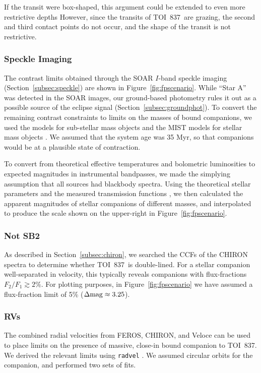 \documentclass[12pt,twocolumn,tighten]{aastex63}
\newcommand{\tn}{TOI~837} %
\begin{document}
If the transit were box-shaped, this argument could be extended to
even more restrictive depths \citep[{\it
e.g.},][]{seager_unique_2003,vanderburg_hr858_2019,rizzuto_tess_2020}
However, since the transits of \tn\ are grazing, the second and third
contact points do not occur, and the shape of the transit is not
restrictive.

\subsubsection{Speckle Imaging}
The contrast limits obtained through the SOAR $I$-band speckle imaging
(Section~\ref{subsec:speckle}) are shown in
Figure~\ref{fig:fpscenario}.  While ``Star A'' was detected in the
SOAR images, our ground-based photometry rules it out as a possible
source of the eclipse signal (Section~\ref{subsec:groundphot}).  To
convert the remaining contrast constraints to limits on the masses of
bound companions, we used the \citet{baraffe_evolutionary_2003} models
for sub-stellar mass objects and the MIST models for stellar mass
objects
\citep{paxton_modules_2011,paxton_modules_2013,paxton_modules_2015,dotter_mesa_2016,choi_mesa_2016}.
We assumed that the system age was 35 Myr, so that companions would be
at a plausible state of contraction.

To convert from theoretical effective temperatures and bolometric
luminosities to expected magnitudes in instrumental bandpasses, we
made the simplying assumption that all sources had blackbody spectra.
Using the theoretical stellar parameters and the measured transmission
functions \citep{tokovinin_ten_2018}, we then calculated the apparent
magnitudes of stellar companions of different masses, and interpolated
to produce the scale shown on the upper-right in
Figure~\ref{fig:fpscenario}.

\subsubsection{Not SB2}
As described in Section~\ref{subsec:chiron}, we searched the CCFs of
the CHIRON spectra to determine whether \tn\ is double-lined.  For a
stellar companion well-separated in velocity, this typically reveals
companions with flux-fractions $F_2/F_1 \gtrsim 2\%$.  For plotting
purposes, in Figure~\ref{fig:fpscenario} we have assumed a
flux-fraction limit of 5\% ($\Delta {\rm mag} \approx 3.25$).

\subsubsection{RVs}
The combined radial velocities from FEROS, CHIRON, and Veloce can be
used to place limits on the presence of massive, close-in bound
companion to \tn.  We derived the relevant limits using
\texttt{radvel} \citep{fulton_radvel_2018}.  We assumed circular
orbits for the companion, and performed two sets of fits.
\end{document}
